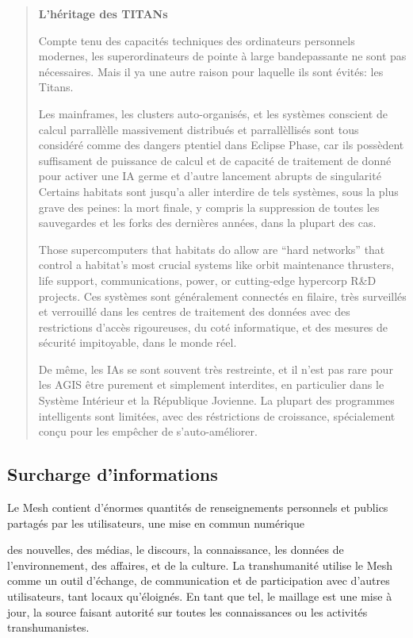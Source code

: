 \begin{quotation} \textbf{L'héritage des TITANs} 

Compte tenu des capacités techniques des ordinateurs personnels modernes, les superordinateurs de pointe à large bandepassante ne sont pas nécessaires. Mais il ya une autre raison pour laquelle ils sont évités: les Titans. 

Les mainframes, les clusters auto-organisés, et les systèmes conscient de calcul parrallèlle massivement distribués et parrallèllisés sont tous considéré comme des dangers ptentiel dans Eclipse Phase, car ils possèdent suffisament de puissance de calcul et de capacité de traitement de donné pour activer une IA germe et d'autre lancement abrupts de singularité Certains habitats sont jusqu'a aller interdire de tels systèmes, sous la plus grave des peines: la mort finale, y compris la suppression de toutes les sauvegardes et les forks des dernières années, dans la plupart des cas. 

Those supercomputers that habitats do allow are “hard networks” that control a habitat’s most crucial systems like orbit maintenance thrusters, life support, communications, power, or cutting-edge hypercorp R\&D projects. Ces systèmes sont généralement connectés en filaire, très surveillés et verrouillé dans les centres de traitement des données avec des restrictions d'accès rigoureuses, du coté informatique,  et des mesures de sécurité impitoyable, dans le monde réel. 

De même, les IAs se sont souvent très restreinte, et il n'est pas rare pour les AGIS être purement et simplement interdites, en particulier dans le Système Intérieur et la République Jovienne. La plupart des programmes intelligents sont limitées, avec des réstrictions de croissance, spécialement conçu pour les empêcher de s'auto-améliorer. \end{quotation} 

\subsection{Surcharge d'informations} 

Le Mesh contient d'énormes quantités de renseignements personnels et publics partagés par les utilisateurs, une mise en commun numérique 

des nouvelles, des médias, le discours, la connaissance, les données de l'environnement, des affaires, et de la culture. La transhumanité utilise le Mesh comme un outil d'échange, de communication et de participation avec d'autres utilisateurs, tant locaux qu'éloignés. En tant que tel, le maillage est une mise à jour, la source faisant autorité sur toutes les connaissances ou les activités transhumanistes. 

